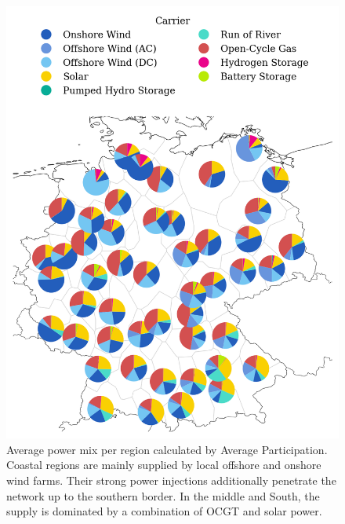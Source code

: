 \documentclass[11pt,twocolumn]{article}
\begin{document}
\begin{figure}
    \includegraphics[width=\linewidth]{de50/power_mix}
    \caption{Average power mix per region calculated by Average Participation. Coastal regions are mainly supplied by local offshore and onshore wind farms. Their strong power injections additionally penetrate the network up to the southern border. In the middle and South, the supply is dominated by a combination of OCGT and solar power.}
    \label{fig:power_mix}
\end{figure}
\end{document}
